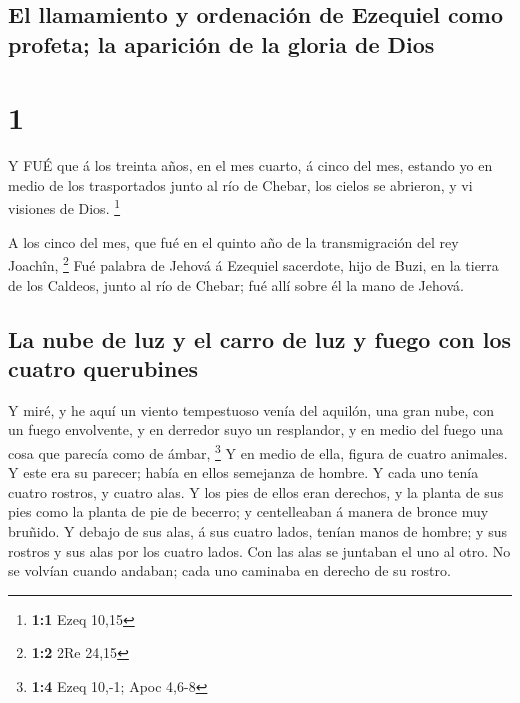 \hypertarget{el-llamamiento-y-ordenaciuxf3n-de-ezequiel-como-profeta-la-apariciuxf3n-de-la-gloria-de-dios}{%
\subsection{El llamamiento y ordenación de Ezequiel como profeta; la
aparición de la gloria de
Dios}\label{el-llamamiento-y-ordenaciuxf3n-de-ezequiel-como-profeta-la-apariciuxf3n-de-la-gloria-de-dios}}

\hypertarget{section}{%
\section{1}\label{section}}

 Y FUÉ que á los treinta años, en el mes cuarto, á cinco del
mes, estando yo en medio de los trasportados junto al río de Chebar, los
cielos se abrieron, y vi visiones de Dios. \footnote{\textbf{1:1} Ezeq
  10,15}

 A los cinco del mes, que fué en el quinto año de la
transmigración del rey Joachîn, \footnote{\textbf{1:2} 2Re 24,15}
 Fué palabra de Jehová á Ezequiel sacerdote, hijo de Buzi,
en la tierra de los Caldeos, junto al río de Chebar; fué allí sobre él
la mano de Jehová.

\hypertarget{la-nube-de-luz-y-el-carro-de-luz-y-fuego-con-los-cuatro-querubines}{%
\subsection{La nube de luz y el carro de luz y fuego con los cuatro
querubines}\label{la-nube-de-luz-y-el-carro-de-luz-y-fuego-con-los-cuatro-querubines}}

 Y miré, y he aquí un viento tempestuoso venía del aquilón,
una gran nube, con un fuego envolvente, y en derredor suyo un
resplandor, y en medio del fuego una cosa que parecía como de ámbar,
\footnote{\textbf{1:4} Ezeq 10,-1; Apoc 4,6-8}  Y en medio
de ella, figura de cuatro animales. Y este era su parecer; había en
ellos semejanza de hombre.  Y cada uno tenía cuatro rostros,
y cuatro alas.  Y los pies de ellos eran derechos, y la
planta de sus pies como la planta de pie de becerro; y centelleaban á
manera de bronce muy bruñido.  Y debajo de sus alas, á sus
cuatro lados, tenían manos de hombre; y sus rostros y sus alas por los
cuatro lados.  Con las alas se juntaban el uno al otro. No
se volvían cuando andaban; cada uno caminaba en derecho de su rostro.

